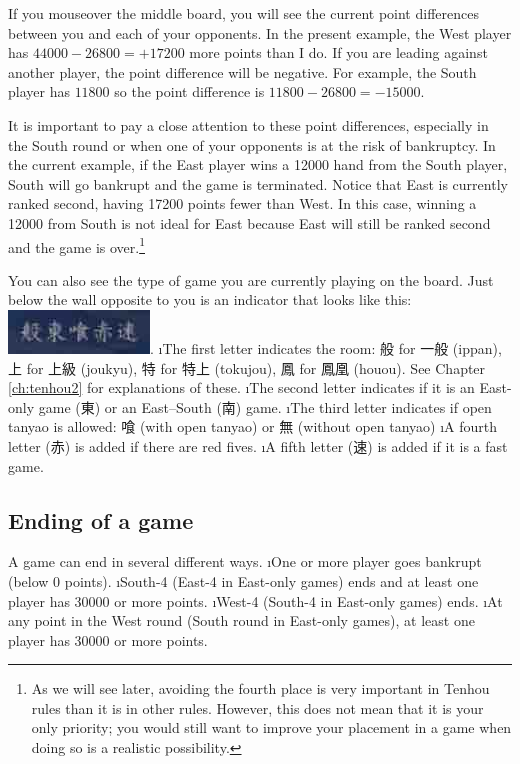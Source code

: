 \bigskip
If you mouseover the middle board, you will see the current point differences between you and each of your opponents. 
In the present example, the West player has $44000 - 26800 = + 17200$ more points than I do. If you are leading against another player, the point difference will be negative. For example, the South player has $11800$ so the point difference is $11800 - 26800 = -15000$. 

\bigskip
It is important to pay a close attention to these point differences, especially in the South round or when one of your opponents is at the risk of bankruptcy. In the current example, if the East player wins a 12000 hand from the South player, South will go bankrupt and the game is terminated. Notice that East is currently ranked second, having 17200 points fewer than West. In this case, winning a 12000 from South is not ideal for East because East will still be ranked second and the game is over.\footnote{As we will see later, avoiding the fourth place is very important in {\jap Tenhou} rules than it is in other rules. However, this does not mean that it is your only priority; you would still want to improve your placement in a game when doing so is a realistic possibility.}

\bigskip

You can also see the type of game you are currently playing on the board. Just below the wall opposite to you is an indicator that looks like this: \includegraphics[width=.2\textwidth,clip]{figs/gametype.jpg}. 
\bi
\i The first letter indicates the room: 般 for 一般 ({\jap ippan}), 上 for 上級 ({\jap joukyu}), 特 for 特上 ({\jap tokujou}), 鳳 for 鳳凰 ({\jap houou}). See Chapter \ref{ch:tenhou2} for explanations of these.
\i The second letter indicates if it is an East-only game (東) or an East--South (南) game.
\i The third letter indicates if open {\jap tanyao} is allowed: 喰 (with open {\jap tanyao}) or 無 (without open {\jap tanyao})
\i A fourth letter (赤) is added if there are red fives.
\i A fifth letter (速) is added if it is a fast game. 
\ei

\vfill

\subsection{Ending of a game}
A game can end in several different ways. 
\bi
\i One or more player goes bankrupt (below 0 points). 
\i South-4 (East-4 in East-only games) ends and at least one player has 30000 or more points.
\i West-4 (South-4 in East-only games) ends.
\i At any point in the West round (South round in East-only games), at least one player has 30000 or more points. 
\ei

